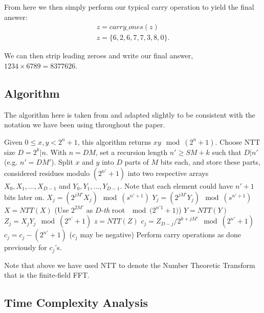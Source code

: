 \documentclass[psamsfonts,reqno]{amsart}
\theoremstyle{definition}
\theoremstyle{remark}
\numberwithin{equation}{section}
\begin{document}
From here we then simply perform our typical carry operation to yield the final answer:
\begin{align*}
	z = carry\_ones(z) \\
	z = \{6, 2, 6, 7, 7, 3, 8, 0\}.
\end{align*}

We can then strip leading zeroes and write our final answer, $\num{1234} \times \num{6789} = \num{8377626}$.

\subsection{Algorithm \nopunct}

The algorithm here is taken from \cite{crandall2005prime} and adapted slightly to be consistent with the notation we have been using throughout the paper.

\begin{algorithm}
	\caption{Sch\"{o}nhage-Strassen FNT}
	\label{fnt_algo}
	\begin{algorithmic}
		\Require Given $0 \leq x, y <2^n+1$, this algorithm returns $xy \mod{(2^n+1)}$.
		\State Choose NTT size $D = 2^k | n$.
		\State With $n = DM$, set a recursion length $n' \geq SM+k$ such that $D | n'$ (e.g. $n'=DM'$).
		\State Split $x$ and $y$ into $D$ parts of $M$ bits each, and store these parts, considered residues modulo $(2^{n'} + 1)$ into two respective arrays $X_0, X_1, ..., X_{D-1}$ and $Y_0, Y_1, ..., Y_{D-1}$. Note that each element could have $n'+1$ bits later on.
			\State $X_j = (2^{jM'}X_j) \mod{(s^{n'+1})}$
			\State $Y_j = (2^{jM'}Y_j) \mod{(s^{n'+1})}$
		\EndFor
		\State $X = NTT(X)$ (Use $2^{2M'}$ as $D$-\textit{th} root $\mod{(2^{n'1}+1})$)
		\State $Y = NTT(Y)$
			\State $Z_j = X_jY_j \mod{(2^{n'}+1)}$
		\EndFor
		\State $z = NTT(Z)$
			\State $c_j = Z_{D-j} / 2^{k+jM'} \mod{(2^{n'}+1)}$
				\State $c_j = c_j - (2^{n'}+1)$ ($c_j$ may be negative)
			\EndIf
		\EndFor
		\State Perform carry operations as done previously for $c_j$'s.
		\State {}
	\end{algorithmic}
\end{algorithm}

Note that above we have used NTT to denote the Number Theoretic Transform that is the finite-field FFT. 

\subsection{Time Complexity Analysis \nopunct}
\end{document}
